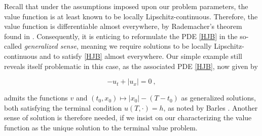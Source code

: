 	Recall that under the assumptions imposed upon our problem parameters, the value function is at least known to be locally Lipschitz-continuous. Therefore, the value function is differentiable almost everywhere, by Rademacher's theorem found in \cite{evans}. Consequently, it is enticing to reformulate the PDE \eqref{HJB} in the so-called \emph{generalized sense}, meaning we require solutions to be locally Lipschitz-continuous and to satisfy \eqref{HJB} almost everywhere. Our simple example still reveals itself problematic in this case, as the associated PDE \eqref{HJB}, now given by
	
	\begin{equation}
	\label{example PDE}
		-u_t + \lvert u_x \rvert = 0 \ ,
	\end{equation}
	
	admits the functions $ v $ and $ (t_0, x_0) \mapsto \lvert x_0 \rvert - (T - t_0) $ as generalized solutions, both satisfying the terminal condition $ u(T, \cdot) = h $, as noted by Barles \cite{barles}. Another sense of solution is therefore needed, if we insist on our characterizing the value function as the unique solution to the terminal value problem.